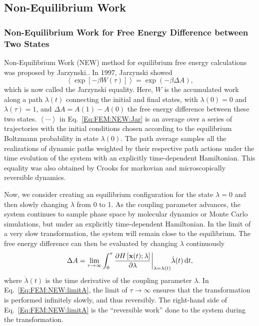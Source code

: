 \subsection{Non-Equilibrium Work\label{Sec:FEM:NEW}}
\subsubsection{Non-Equilibrium Work for Free Energy Difference between Two States\label{Sec:FEM:NEW:StateFE}}
Non-Equilibrium Work (NEW) method for equilibrium free energy calculations was proposed by Jarzynski.\cite{JarzynskiPRL1997}. 
In 1997, Jarzynski showed
\begin{equation}
\left< \exp\left[-\beta W(\tau)\right] \right> = \exp{(-\beta \Delta A)},
\label{Eq:FEM:NEW:Jar}
\end{equation}
which is now called the Jarzynski equality. Here, $W$ is the accumulated work along a path $\lambda(t)$ connecting the initial and final states, with $\lambda(0)=0$ and $\lambda(\tau)=1$, and $\Delta A = A(1) - A(0)$ the free energy difference between these two states. 
$\left \langle \cdots \right \rangle$ in Eq.~\ref{Eq:FEM:NEW:Jar} is an average over a series of trajectories with the initial conditions chosen according to the equilibrium Boltzmann probability in state $\lambda(0)$. The path average samples all the realizations of dynamic paths weighted by their respective path actions under the time evolution of the system with an explicitly time-dependent Hamiltonian. This equality was also obtained by Crooks for markovian and microscopically reversible dynamics.\cite{CrooksJSP1998} 

Now, we consider creating an equilibrium configuration for the state $\lambda=0$ and then slowly changing $\lambda$ from 0 to 1. As the coupling parameter advances, the system continues to sample phase space by molecular dynamics or Monte Carlo simulations, but under an explicitly time-dependent Hamiltonian. In the limit of a very slow transformation, the system will remain close to the equilibrium. The free energy difference can then be evaluated by changing $\lambda$ continuously
\begin{equation}
\Delta A =\lim_{\tau\to\infty} \int_{0}^{\tau} {\frac{\partial{H\left[\textbf{x}(t);\lambda\right]}}{\partial{\lambda}}\bigg\rvert}_{\lambda=\lambda(t)} \dot{\lambda}(t) \mathop{}\!\mathrm{d} t,
\label{Eq:FEM:NEW:limitA}
\end{equation}  
where $\dot{\lambda}(t)$ is the time derivative of the coupling parameter $\lambda$. In Eq.~\ref{Eq:FEM:NEW:limitA}, the limit of $\tau\to\infty$ ensures that the transformation is performed infinitely slowly, and thus reversibly. The right-hand side of Eq.~\ref{Eq:FEM:NEW:limitA} is the ``reversible work'' done to the system during the transformation.

